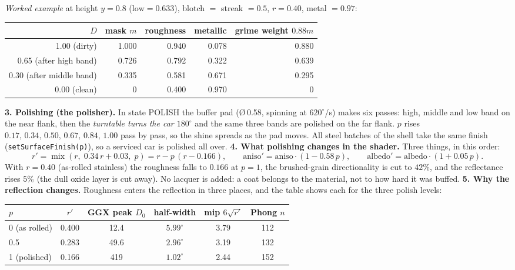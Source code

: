 \documentclass[10pt,a4paper]{article}
\newcommand{\fn}[1]{\texttt{#1}}
\let\oldtoprule\toprule
\renewcommand{\toprule}{\oldtoprule\rowcolor{smhead}}
\begin{document}
\emph{Worked example} at height $y=0.8$ ($\text{low}=0.633$), blotch $=$ streak $=0.5$, $r=0.40$, metal $=0.97$:
\begin{center}\scriptsize\begin{tabular}{@{}rrrrr@{}}\toprule $D$ & mask $m$ & roughness & metallic & grime weight $0.88m$\\\midrule
1.00 (dirty) & 1.000 & 0.940 & 0.078 & 0.880\\ 0.65 (after high band) & 0.726 & 0.792 & 0.322 & 0.639\\ 0.30 (after middle band) & 0.335 & 0.581 & 0.671 & 0.295\\ 0.00 (clean) & 0 & 0.400 & 0.970 & 0\\\bottomrule\end{tabular}\end{center}
\textbf{3. Polishing (the polisher).} In state POLISH the buffer pad (\O\,0.58, spinning at $620^\circ$/s) makes six passes: high, middle and low band on the near flank, then the \emph{turntable turns the car $180^\circ$} and the same three bands
are polished on the far flank. $p$ rises $0.17,\,0.34,\,0.50,\,0.67,\,0.84,\,1.00$ pass by pass, so the shine spreads as the pad moves. All steel batches of the shell take the same finish (\fn{setSurfaceFinish(p)}), so a serviced car is polished all over.
\textbf{4. What polishing changes in the shader.} Three things, in this order:
\begin{equation}r'=\operatorname{mix}(r,\;0.34\,r+0.03,\;p)=r-p\,(r-0.166),\qquad \text{aniso}'=\text{aniso}\cdot(1-0.58\,p),\qquad \text{albedo}'=\text{albedo}\cdot(1+0.05\,p).\label{eq:polish}\end{equation}
With $r=0.40$ (as-rolled stainless) the roughness falls to $0.166$ at $p=1$, the brushed-grain directionality is cut to $42\%$, and the reflectance rises $5\%$ (the dull oxide layer is cut away). No lacquer is added: a coat belongs to the material, not to how hard it was buffed.
\textbf{5. Why the reflection changes.} Roughness enters the reflection in three places, and the table shows each for the three polish levels:
\begin{center}\scriptsize\begin{tabular}{@{}lccccc@{}}\toprule
$p$ & $r'$ & GGX peak $D_0$ & half-width & mip $6\sqrt{r'}$ & Phong $n$\\\midrule
0 (as rolled) & 0.400 & 12.4 & $5.99^\circ$ & 3.79 & 112\\ 0.5 & 0.283 & 49.6 & $2.96^\circ$ & 3.19 & 132\\ 1 (polished) & 0.166 & 419 & $1.02^\circ$ & 2.44 & 152\\\bottomrule\end{tabular}\end{center}
\end{document}
